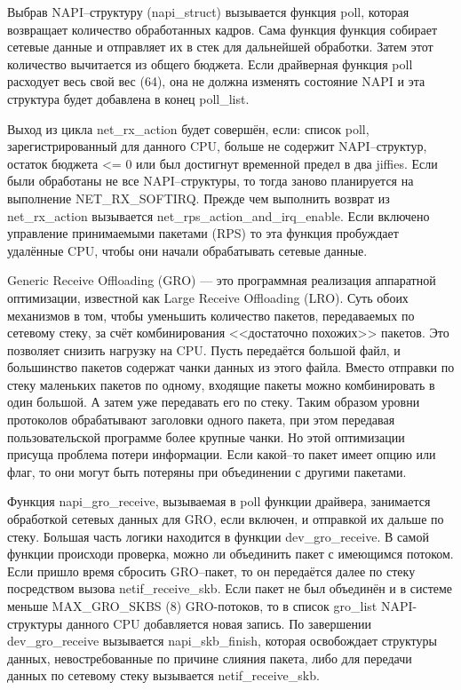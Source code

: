 Выбрав NAPI--структуру (napi\_struct)  вызывается функция poll, которая возвращает количество обработанных кадров. Сама функция функция собирает сетевые данные и отправляет их в стек для дальнейшей обработки. Затем этот количество вычитается из общего бюджета. Если драйверная функция poll расходует весь свой вес (64), она не должна изменять состояние NAPI и эта структура будет добавлена в конец poll\_list.

Выход из цикла net\_rx\_action будет совершён, если: список poll, зарегистрированный для данного CPU, больше не содержит NAPI--структур, остаток бюджета <= 0 или был достигнут временной предел в два jiffies. Если были обработаны не все NAPI--структуры, то тогда заново планируется на выполнение NET\_RX\_SOFTIRQ. Прежде чем выполнить возврат из net\_rx\_action вызывается net\_rps\_action\_and\_irq\_enable. Если включено управление принимаемыми пакетами (RPS) то эта функция пробуждает удалённые CPU, чтобы они начали обрабатывать сетевые данные.

Generic Receive Offloading (GRO) — это программная реализация аппаратной оптимизации, известной как Large Receive Offloading (LRO). Суть обоих механизмов в том, чтобы уменьшить количество пакетов, передаваемых по сетевому стеку, за счёт комбинирования <<достаточно похожих>> пакетов. Это позволяет снизить нагрузку на CPU. Пусть передаётся большой файл, и большинство пакетов содержат чанки данных из этого файла. Вместо отправки по стеку маленьких пакетов по одному, входящие пакеты можно комбинировать в один большой. А затем уже передавать его по стеку. Таким образом уровни протоколов обрабатывают заголовки одного пакета, при этом передавая пользовательской программе более крупные чанки. Но этой оптимизации присуща проблема потери информации. Если какой--то пакет имеет опцию или флаг, то они могут быть потеряны при объединении с другими пакетами.

Функция napi\_gro\_receive, вызываемая в poll функции драйвера, занимается обработкой сетевых данных для GRO, если включен, и отправкой их дальше по стеку. Большая часть логики находится в функции dev\_gro\_receive. В самой функции происходи проверка, можно ли объединить пакет с имеющимся потоком. Если пришло время сбросить GRO--пакет, то он передаётся далее по стеку посредством вызова netif\_receive\_skb. Если пакет не был объединён и в системе меньше MAX\_GRO\_SKBS (8) GRO-потоков, то в список gro\_list NAPI-структуры данного CPU добавляется новая запись. По завершении dev\_gro\_receive вызывается napi\_skb\_finish, которая освобождает структуры данных, невостребованные по причине слияния пакета, либо для передачи данных по сетевому стеку вызывается netif\_receive\_skb.

